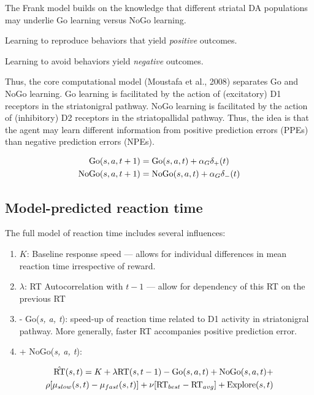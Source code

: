 \documentclass[12pt]{article}
\renewenvironment{description}[1][0pt]
  {\list{}{\labelwidth=0pt \leftmargin=#1
   \let\makelabel\descriptionlabel}}
  {\endlist}
\begin{document}
The Frank model builds on the knowledge that different striatal DA populations may underlie Go learning versus NoGo learning.

\begin{description}[1cm] \itemsep1pt \parskip0pt 
	\item [Go Learning] Learning to reproduce behaviors that yield \textit{positive} outcomes.
	\item [NoGo Learning] Learning to avoid behaviors yield \textit{negative} outcomes.
\end {description}

Thus, the core computational model (Moustafa et al., 2008) separates Go and NoGo learning. Go learning is facilitated by the action of (excitatory) D1 receptors in the striatonigral pathway. NoGo learning is facilitated by the action of (inhibitory) D2 receptors in the striatopallidal pathway. Thus, the idea is that the agent may learn different information from positive prediction errors (PPEs) than negative prediction errors (NPEs).

\begin{align}
\textnormal{Go}(s, a, t+1) &= \textnormal{Go}(s, a, t) + \alpha_G\delta_+(t) \\
\textnormal{NoGo}(s, a, t+1) &= \textnormal{NoGo}(s, a, t) + \alpha_G\delta_-(t)
\end{align}

\subsection{Model-predicted reaction time}
The full model of reaction time includes several influences:

\begin{enumerate}
	\item $K$: Baseline response speed --- allows for individual differences in mean reaction time irrespective of reward.
	\item $\lambda$: RT Autocorrelation with $t - 1$ --- allow for dependency of this RT on the previous RT
	\item - Go(\textit{s, a, t}): speed-up of reaction time related to D1 activity in striatonigral pathway. More generally, faster RT accompanies positive prediction error.
	\item + NoGo(\textit{s, a, t}): 
	
\end{enumerate}

\begin{equation}
\begin{split}
\hat{\textnormal{RT}}(s,t) = 
	K + 
	\lambda\textnormal{RT}(s, t - 1 ) -
	\textnormal{Go}(s, a, t) +
	\textnormal{NoGo}(s, a, t) + \\
	\rho [\mu_{slow}(s, t) - \mu_{fast}(s, t)] + 
	\nu[\textnormal{RT}_{best} - \textnormal{RT}_{avg}] +
	\textnormal{Explore}(s, t)
\end{split}
\end{equation}
\end{document}
